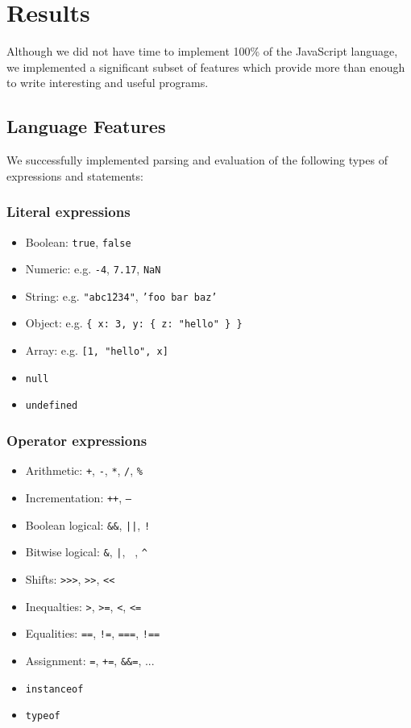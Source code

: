 \documentclass{article}
\begin{document}
\section*{Results}

Although we did not have time to implement 100\% of the JavaScript language, we
implemented a significant subset of features which provide more than enough to
write interesting and useful programs.

\subsection*{Language Features}

We successfully implemented parsing and evaluation of the following types of
expressions and statements:

\subsubsection*{Literal expressions}

\begin{itemize}
  \item Boolean: \texttt{true}, \texttt{false}
  \item Numeric: e.g. \texttt{-4}, \texttt{7.17}, \texttt{NaN}
  \item String: e.g. \texttt{"abc\u1234"}, \texttt{'foo bar baz'}
  \item Object: e.g. \texttt{\{ x: 3, y: \{ z: "hello" \} \} }
  \item Array: e.g. \texttt{[1, "hello", x]}
  \item \texttt{null}
  \item \texttt{undefined}
\end{itemize}

\subsubsection*{Operator expressions}

\begin{itemize}
  \item Arithmetic: \texttt{+}, \texttt{-}, \texttt{*}, \texttt{/}, \texttt{\%}
  \item Incrementation: \texttt{++}, \texttt{--}
  \item Boolean logical: \texttt{\&\&}, \texttt{||}, \texttt{!}
  \item Bitwise logical: \texttt{\&}, \texttt{|}, \texttt{~}, \texttt{\^}
  \item Shifts: \texttt{>>>}, \texttt{>>}, \texttt{<<}
  \item Inequalties: \texttt{>}, \texttt{>=}, \texttt{<}, \texttt{<=}
  \item Equalities: \texttt{==}, \texttt{!=}, \texttt{===}, \texttt{!==}
  \item Assignment: \texttt{=}, \texttt{+=}, \texttt{\&\&=}, ...
  \item \texttt{instanceof}
  \item \texttt{typeof}
\end{itemize}
\end{document}
